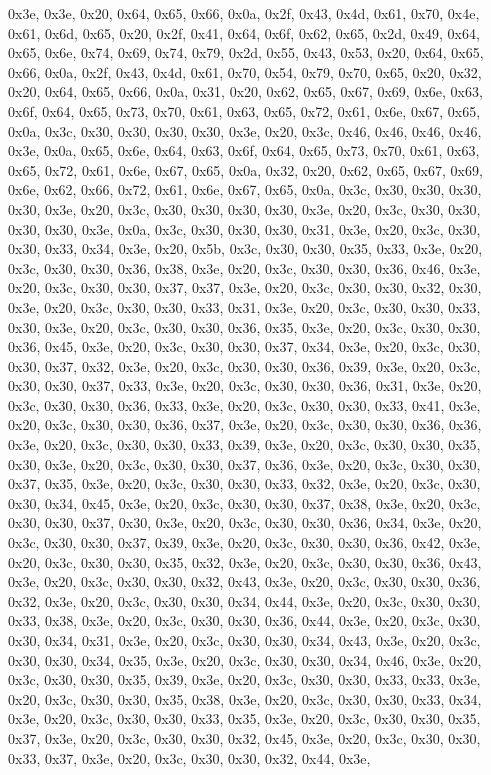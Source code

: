 \documentclass[
]{book}
\begin{document}
0x3e, 0x3e, 0x20, 0x64, 0x65, 0x66, 0x0a, 0x2f, 0x43, 0x4d, 0x61, 0x70, 0x4e, 0x61, 0x6d, 0x65, 0x20, 0x2f, 0x41, 0x64, 0x6f, 0x62, 0x65, 0x2d, 0x49, 0x64, 0x65, 0x6e, 0x74, 0x69, 0x74, 0x79, 0x2d, 0x55, 0x43, 0x53, 0x20, 0x64, 0x65, 0x66, 0x0a, 0x2f, 0x43, 0x4d, 0x61, 0x70, 0x54, 0x79, 0x70, 0x65, 0x20, 0x32, 0x20, 0x64, 0x65, 0x66, 0x0a, 0x31, 0x20, 0x62, 0x65, 0x67, 0x69, 0x6e, 0x63, 0x6f, 0x64, 0x65, 0x73, 0x70, 0x61, 0x63, 0x65, 0x72, 0x61, 0x6e, 0x67, 0x65, 0x0a, 0x3c, 0x30, 0x30, 0x30, 0x30,
0x3e, 0x20, 0x3c, 0x46, 0x46, 0x46, 0x46, 0x3e, 0x0a, 0x65, 0x6e, 0x64, 0x63, 0x6f, 0x64, 0x65, 0x73, 0x70, 0x61, 0x63, 0x65, 0x72, 0x61, 0x6e, 0x67, 0x65, 0x0a, 0x32, 0x20, 0x62, 0x65, 0x67, 0x69, 0x6e, 0x62, 0x66, 0x72, 0x61, 0x6e, 0x67, 0x65, 0x0a, 0x3c, 0x30, 0x30, 0x30, 0x30, 0x3e, 0x20, 0x3c, 0x30, 0x30, 0x30, 0x30, 0x3e, 0x20, 0x3c, 0x30, 0x30, 0x30, 0x30, 0x3e, 0x0a, 0x3c, 0x30, 0x30, 0x30, 0x31, 0x3e, 0x20, 0x3c, 0x30, 0x30, 0x33, 0x34, 0x3e, 0x20, 0x5b, 0x3c, 0x30, 0x30, 0x35, 0x33, 0x3e,
0x20, 0x3c, 0x30, 0x30, 0x36, 0x38, 0x3e, 0x20, 0x3c, 0x30, 0x30, 0x36, 0x46, 0x3e, 0x20, 0x3c, 0x30, 0x30, 0x37, 0x37, 0x3e, 0x20, 0x3c, 0x30, 0x30, 0x32, 0x30, 0x3e, 0x20, 0x3c, 0x30, 0x30, 0x33, 0x31, 0x3e, 0x20, 0x3c, 0x30, 0x30, 0x33, 0x30, 0x3e, 0x20, 0x3c, 0x30, 0x30, 0x36, 0x35, 0x3e, 0x20, 0x3c, 0x30, 0x30, 0x36, 0x45, 0x3e, 0x20, 0x3c, 0x30, 0x30, 0x37, 0x34, 0x3e, 0x20, 0x3c, 0x30, 0x30, 0x37, 0x32, 0x3e, 0x20, 0x3c, 0x30, 0x30, 0x36, 0x39, 0x3e, 0x20, 0x3c, 0x30, 0x30, 0x37, 0x33, 0x3e,
0x20, 0x3c, 0x30, 0x30, 0x36, 0x31, 0x3e, 0x20, 0x3c, 0x30, 0x30, 0x36, 0x33, 0x3e, 0x20, 0x3c, 0x30, 0x30, 0x33, 0x41, 0x3e, 0x20, 0x3c, 0x30, 0x30, 0x36, 0x37, 0x3e, 0x20, 0x3c, 0x30, 0x30, 0x36, 0x36, 0x3e, 0x20, 0x3c, 0x30, 0x30, 0x33, 0x39, 0x3e, 0x20, 0x3c, 0x30, 0x30, 0x35, 0x30, 0x3e, 0x20, 0x3c, 0x30, 0x30, 0x37, 0x36, 0x3e, 0x20, 0x3c, 0x30, 0x30, 0x37, 0x35, 0x3e, 0x20, 0x3c, 0x30, 0x30, 0x33, 0x32, 0x3e, 0x20, 0x3c, 0x30, 0x30, 0x34, 0x45, 0x3e, 0x20, 0x3c, 0x30, 0x30, 0x37, 0x38, 0x3e,
0x20, 0x3c, 0x30, 0x30, 0x37, 0x30, 0x3e, 0x20, 0x3c, 0x30, 0x30, 0x36, 0x34, 0x3e, 0x20, 0x3c, 0x30, 0x30, 0x37, 0x39, 0x3e, 0x20, 0x3c, 0x30, 0x30, 0x36, 0x42, 0x3e, 0x20, 0x3c, 0x30, 0x30, 0x35, 0x32, 0x3e, 0x20, 0x3c, 0x30, 0x30, 0x36, 0x43, 0x3e, 0x20, 0x3c, 0x30, 0x30, 0x32, 0x43, 0x3e, 0x20, 0x3c, 0x30, 0x30, 0x36, 0x32, 0x3e, 0x20, 0x3c, 0x30, 0x30, 0x34, 0x44, 0x3e, 0x20, 0x3c, 0x30, 0x30, 0x33, 0x38, 0x3e, 0x20, 0x3c, 0x30, 0x30, 0x36, 0x44, 0x3e, 0x20, 0x3c, 0x30, 0x30, 0x34, 0x31, 0x3e,
0x20, 0x3c, 0x30, 0x30, 0x34, 0x43, 0x3e, 0x20, 0x3c, 0x30, 0x30, 0x34, 0x35, 0x3e, 0x20, 0x3c, 0x30, 0x30, 0x34, 0x46, 0x3e, 0x20, 0x3c, 0x30, 0x30, 0x35, 0x39, 0x3e, 0x20, 0x3c, 0x30, 0x30, 0x33, 0x33, 0x3e, 0x20, 0x3c, 0x30, 0x30, 0x35, 0x38, 0x3e, 0x20, 0x3c, 0x30, 0x30, 0x33, 0x34, 0x3e, 0x20, 0x3c, 0x30, 0x30, 0x33, 0x35, 0x3e, 0x20, 0x3c, 0x30, 0x30, 0x35, 0x37, 0x3e, 0x20, 0x3c, 0x30, 0x30, 0x32, 0x45, 0x3e, 0x20, 0x3c, 0x30, 0x30, 0x33, 0x37, 0x3e, 0x20, 0x3c, 0x30, 0x30, 0x32, 0x44, 0x3e,
\end{document}
